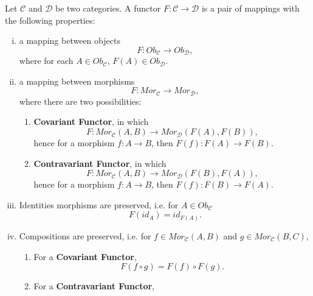 \begin{definition}[Functor]
	Let $\mathcal C$ and $\mathcal D$ be two categories. A functor $F: \mathcal C \to \mathcal D$ is
	a pair of mappings with the following properties:
	\begin{enumerate}[(i)]
		\item a mapping between objects
		      \begin{displaymath}
			      F:Ob_\mathcal C \to Ob_\mathcal D,
		      \end{displaymath}
		      where for each $A \in Ob_\mathcal C$, $F(A) \in Ob_\mathcal D$.
		\item a mapping between morphisms
		      \begin{displaymath}
			      F:Mor_\mathcal C \to Mor_\mathcal D,
		      \end{displaymath}
		      where there are two possibilities:
		      \begin{enumerate}
			      \item \textbf{Covariant Functor}, in which
			            \begin{displaymath}
				            F:Mor_\mathcal C(A,B) \to Mor_\mathcal D (F(A),F(B)),
			            \end{displaymath}
			            hence for a morphism $f:A \to B$, then $F(f):F(A) \to F(B)$.
			      \item \textbf{Contravariant Functor}, in which
			            \begin{displaymath}
				            F:Mor_\mathcal C(A,B) \to Mor_\mathcal D (F(B),F(A)),
			            \end{displaymath}
			            hence for a morphism $f:A \to B$, then $F(f):F(B) \to F(A)$.
		      \end{enumerate}
		\item Identities morphisms are preserved, i.e. for $A \in Ob_\mathcal C$
		      \begin{displaymath}
			      F(id_A) =  id_{F(A)}.
		      \end{displaymath}
		\item Compositions are preserved, i.e. for $f \in Mor_\mathcal C(A,B)$
		      and $ g \in Mor_\mathcal C(B,C)$,
		      \begin{enumerate}
			      \item For a \textbf{Covariant Functor},
			            \begin{displaymath}
				            F(f \circ g) = F(f) \circ F(g).
			            \end{displaymath}
			      \item For a \textbf{Contravariant Functor},

\end{enumerate}
\end{enumerate}
\end{definition}
